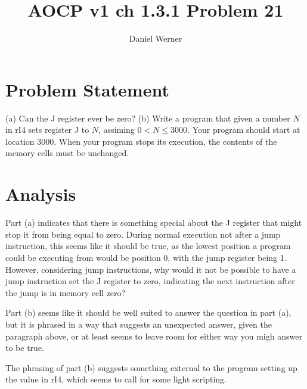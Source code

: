 \documentclass{article}
\title{AOCP v1 ch 1.3.1 Problem 21}
\author{Daniel Werner}
\begin{document}
\maketitle

\section*{
    Problem Statement
}

(a) Can the J register ever be zero? (b) Write a program that given
a number $N$ in rI4 sets register J to $N$, assiming
$0 < N \le 3000$.  Your program should start at location 3000.
When your program stops its execution, the contents of the memory
cells must be unchanged.

\section*{
    Analysis
}

Part (a) indicates that there is something special about the J register
that might stop it from being equal to zero.  During normal execution not
after a jump instruction, this seems like it should be true, as the
lowest position a program could be executing from would be position 0,
with the jump register being 1.  However, considering jump instructions,
why would it not be possible to have a jump instruction set the J register
to zero, indicating the next instruction after the jump is in memory cell
zero?

\par

Part (b) seems like it should be well suited to answer the question in part
(a), but it is phrased in a way that suggests an unexpected answer, given the
paragraph above, or at least seems to leave room for either way you migh
answer to be true.

\par

The phrasing of part (b) suggests something external to the program setting
up the value in rI4, which seems to call for some light scripting.
\end{document}
